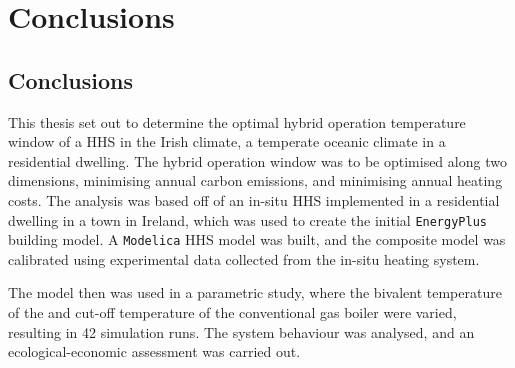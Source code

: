 \chapter{Conclusions}\label{ch:conclusions} 

\section{Conclusions}
This thesis set out to determine the optimal hybrid operation temperature window of a \ac{HHS} in the Irish climate, a temperate oceanic climate in a residential dwelling. The hybrid operation window was to be optimised along two dimensions, minimising annual carbon emissions, and minimising annual heating costs. The analysis was based off of an in-situ \ac{HHS} implemented in a residential dwelling in a town in Ireland, which was used to create the initial \texttt{EnergyPlus} building model. A \texttt{Modelica} \ac{HHS} model was built, and the composite model was calibrated using experimental data collected from the in-situ heating system.

The model then was used in a parametric study, where the bivalent temperature of the \HP and cut-off temperature of the conventional gas boiler were varied, resulting in 42 simulation runs. The system behaviour was analysed, and an ecological-economic assessment was carried out.

